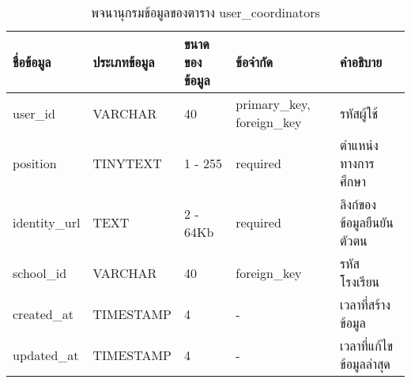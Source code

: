 \begin{table}[H]
    \caption{พจนานุกรมข้อมูลของตาราง user\_coordinators}
    \label{tab:database-user-coordinators}
    \begin{tabularx}{\textwidth}{ | p{1.75cm} | p{2.20cm} | p{2.45cm} | p{2cm} | X | }
    \hline
    \textbf{ชื่อข้อมูล} & \textbf{ประเภทข้อมูล} & \textbf{ขนาดของข้อมูล} & \textbf{ข้อจำกัด} & \textbf{คำอธิบาย} \\
    \hline
    user\_id & VARCHAR & 40 & primary\_key, foreign\_key & รหัสผู้ใช้ \\
    \hline
    position & TINYTEXT & 1 - 255 & required & ตำแหน่งทางการศึกษา \\
    \hline
    identity\_url & TEXT & 2 - 64Kb & required & ลิงก์ของข้อมูลยืนยันตัวตน \\
    \hline
    school\_id & VARCHAR & 40 & foreign\_key & รหัสโรงเรียน \\
    \hline
    created\_at & TIMESTAMP & 4 & - & เวลาที่สร้างข้อมูล \\
    \hline
    updated\_at & TIMESTAMP & 4 & - & เวลาที่แก้ไขข้อมูลล่าสุด \\
    \hline
    \end{tabularx}
\end{table}
